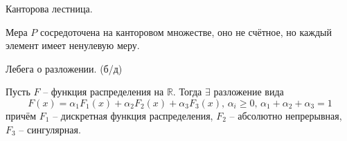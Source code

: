 \begin{example}
	Канторова лестница.

	Мера $P$ сосредоточена на канторовом множестве, оно не счётное, но каждый элемент имеет ненулевую меру.
\end{example}

\begin{theorem}
	Лебега о разложении. (б/д)

	Пусть $F$ -- функция распределения на $\mathbb{R}$. Тогда $\exists$ разложение вида
	\[F(x) = \alpha_1F_1(x) + \alpha_2F_2(x) + \alpha_3F_3(x),\, \alpha_i \geq 0,\, \alpha_1 + \alpha_2 + \alpha_3 = 1\]
	причём $F_1$ -- дискретная функция распределения, $F_2$ -- абсолютно непрерывная, $F_3$ -- сингулярная.
\end{theorem}
